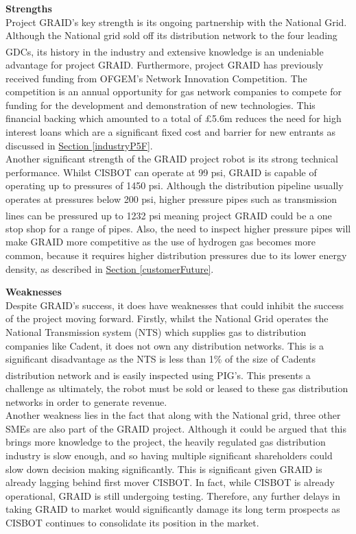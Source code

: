 \documentclass[11pt]{article}		%
\newcommand{\supercite}[1]{\textsuperscript{\cite{#1}}}		%
\newcommand{\sectref}[1]{\hyperref[#1]{Section \ref*{#1}}}     %
\begin{document}
			\textbf{Strengths} \\
			Project GRAID's key strength is its ongoing partnership with the National Grid. Although the National grid sold off its distribution network to the four leading GDCs\supercite{sellnetwork}, its history in the industry and extensive knowledge is an undeniable advantage for project GRAID. Furthermore, project GRAID has previously received funding from OFGEM's Network Innovation Competition. The competition is an annual opportunity for gas network companies to compete for funding for the development and demonstration of new technologies. This financial backing which amounted to a total of £5.6m reduces the need for high interest loans which are a significant fixed cost and barrier for new entrants as discussed in \sectref{industryP5F}. \\
		    \hspace*{2ex}Another significant strength of the GRAID project robot is its strong technical performance. Whilst CISBOT can operate at 99 psi, GRAID is capable of operating up to pressures of 1450 psi. Although the distribution pipeline usually operates at pressures below 200 psi, higher pressure pipes such as transmission lines can be pressured up to 1232 psi\supercite{transmissionpressure} meaning project GRAID could be a one stop shop for a range of pipes. Also, the need to inspect higher pressure pipes will make GRAID more competitive as the use of hydrogen gas becomes more common, because it requires higher distribution pressures due to its lower energy density, as described in \sectref{customerFuture}. 
	        
	        \textbf{Weaknesses}\\
	        Despite GRAID’s success, it does have weaknesses that could inhibit the success of the project moving forward. Firstly, whilst the National Grid operates the National Transmission system (NTS) which supplies gas to distribution companies like Cadent, it does not own any distribution networks. This is a significant disadvantage as the NTS is less than 1\% of the size of Cadents distribution network\supercite{NTSlength} and is easily inspected using PIG’s. This presents a challenge as ultimately, the robot must be sold or leased to these gas distribution networks in order to generate revenue. \\
	        \hspace*{2ex}Another weakness lies in the fact that along with the National grid, three other SMEs are also part of the GRAID project. Although it could be argued that this brings more knowledge to the project, the heavily regulated gas distribution industry is slow enough, and so having multiple significant shareholders could slow down decision making significantly. This is significant given GRAID is already lagging behind first mover CISBOT. In fact, while CISBOT is already operational, GRAID is still undergoing testing. Therefore, any further delays in taking GRAID to market would significantly damage its long term prospects as CISBOT continues to consolidate its position in the market.
	        
\end{document}
